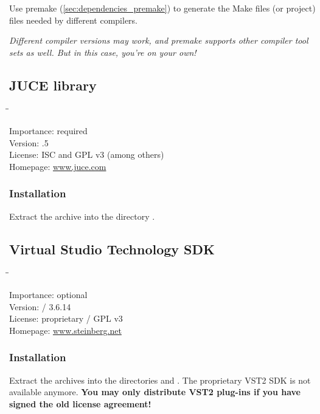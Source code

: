 Use premake (\ref{sec:dependencies_premake}) to generate the Make
files (or project) files needed by different compilers.

\emph{Different compiler versions may work, and premake supports other
  compiler tool sets as well.  But in this case, you're on your own!}

\subsection{JUCE library}

\begin{tabbing}
  \hspace*{6em}\=\=\kill

  Importance:  \> required \\
  Version:     .5 \\
  License:     \> ISC and GPL v3 (among others) \\
  Homepage:    \> \href{http://www.juce.com/}{www.juce.com}
\end{tabbing}

\subsubsection{Installation}

Extract the archive into the directory .

\subsection{Virtual Studio Technology SDK}

\begin{tabbing}
  \hspace*{6em}\=\=\kill

  Importance:  \> optional \\
  Version:      / 3.6.14 \\
  License:     \> proprietary / GPL v3 \\
  Homepage:    \> \href{http://www.steinberg.net/en/company/developer.html}{www.steinberg.net}
\end{tabbing}

\subsubsection{Installation}

Extract the archives into the directories  and
.  The proprietary VST2 SDK is not available
anymore.  \textbf{You may only distribute VST2 plug-ins if you have
  signed the old license agreement!}

